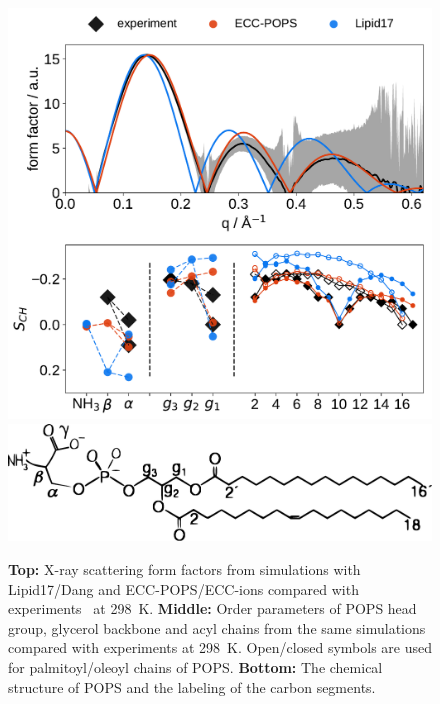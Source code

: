 \documentclass[journal=jpcbfk,manuscript=article]{achemso}
\newlength{\figwidth}
\begin{document}
\begin{figure}[tb!] 
  \centering 
  \includegraphics[width=\figwidth]{../img/ecc_pops/Order-parameters_form-factors_exp-L17-ECC-lipids.pdf}
  \includegraphics[width=\figwidth]{../img/POPSstructure.pdf} 
\hfill
  \caption{\label{simVSexpNOions_POPS} 
    \textbf{Top:} X-ray scattering form factors from simulations with Lipid17/Dang \citep{lipid17-future, dang2006} and 
    ECC-POPS/ECC-ions \cite{martinek17, Pluhackova2016} compared with experiments~\citep{kucerka14} at 298~K. 
    \textbf{Middle:} Order parameters of POPS head group, glycerol backbone and acyl chains  
    from the same simulations 
    compared with experiments at 298~K. \citep{NMRlipidsIV}
    Open/closed symbols are used for palmitoyl/oleoyl chains of POPS. 
    \textbf{Bottom:} The chemical structure of POPS and the labeling of the carbon segments. 
  }  
\end{figure} 
\end{document}
